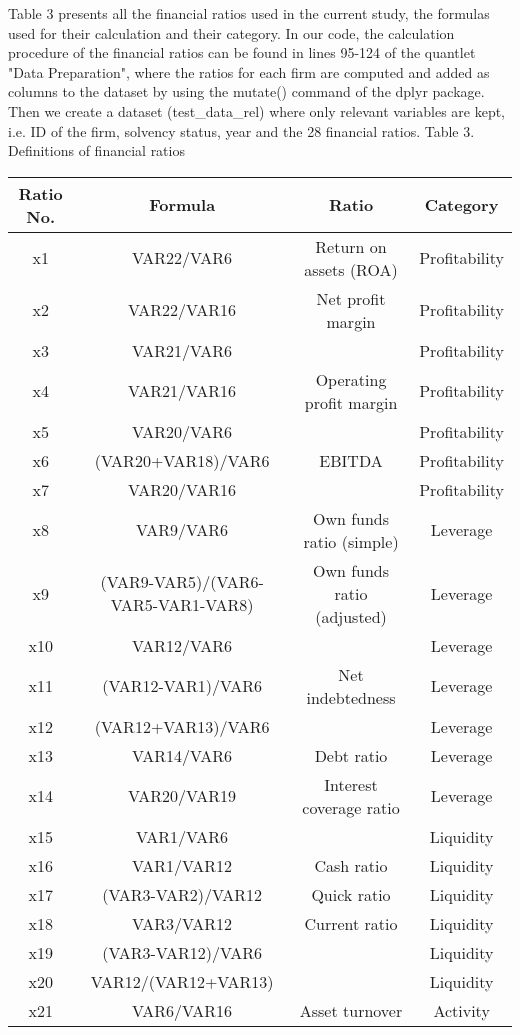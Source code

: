\documentclass[11pt]{article}
\begin{document}
 Table 3 presents all the financial ratios used in the current study, the formulas used for their calculation and their category. In our code, the calculation procedure of the financial ratios can be found in lines 95-124 of the quantlet "Data Preparation", where the ratios for each firm are computed and added as columns to the dataset by using the mutate() command of the dplyr package. Then we create a dataset (test\_data\_rel) where only relevant variables are kept, i.e. ID of the firm, solvency status, year and the 28 financial ratios. 
 \newpage
 Table 3. Definitions of financial ratios
 \begin{center}
\scriptsize
\begin{tabular}{cccc} 
\hline\hline
Ratio No. & Formula & Ratio & Category\\ 
\hline
x1 & VAR22/VAR6 & Return on assets (ROA) & Profitability\\
x2 & VAR22/VAR16 & Net profit margin & Profitability\\
x3 & VAR21/VAR6 & & Profitability\\
x4 & VAR21/VAR16 & Operating profit margin & Profitability\\
x5 & VAR20/VAR6 & & Profitability\\
x6 & (VAR20+VAR18)/VAR6 & EBITDA & Profitability\\ 
x7 & VAR20/VAR16 & & Profitability\\
x8 & VAR9/VAR6 & Own funds ratio (simple) & Leverage\\
x9 & (VAR9-VAR5)/(VAR6-VAR5-VAR1-VAR8) & Own funds ratio (adjusted) & Leverage\\
x10 & VAR12/VAR6 & & Leverage\\
x11 & (VAR12-VAR1)/VAR6 & Net indebtedness & Leverage\\
x12 & (VAR12+VAR13)/VAR6 & & Leverage\\
x13 & VAR14/VAR6 & Debt ratio & Leverage\\
x14 & VAR20/VAR19 & Interest coverage ratio & Leverage\\  
x15 & VAR1/VAR6 & & Liquidity\\
x16 & VAR1/VAR12 & Cash ratio & Liquidity\\
x17 & (VAR3-VAR2)/VAR12 & Quick ratio & Liquidity\\
x18 & VAR3/VAR12 & Current ratio & Liquidity\\ 
x19 & (VAR3-VAR12)/VAR6 & & Liquidity\\
x20 & VAR12/(VAR12+VAR13) & & Liquidity\\
x21 & VAR6/VAR16 & Asset turnover & Activity\\

\end{tabular}
\end{center}
\end{document}
